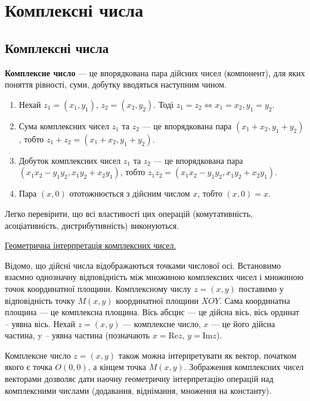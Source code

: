 \chapter{Комплексні числа}


\section{Комплексні числа}

\begin{definition}
	\textbf{Комплексне число} --- це впорядкована пара дійсних чисел
	(компонент), для яких поняття рівності, суми, добутку вводяться наступним чином.
\end{definition}

\begin{enumerate}
	\item Нехай $z_1 = (x_1,y_1)$, $z_2 = (x_2,y_2)$. Тоді $z_1 = z_2 \Leftrightarrow x_1 = x_2, y_1 = y_2$.
	
	\item Сума комплексних чисел $z_1$ та $z_2$ --- це впорядкована пара $(x_1 + x_2,y_1 + y_2)$,
	тобто $z_1 + z_2 = (x_1 + x_2,y_1 + y_2)$.

	\item Добуток комплексних чисел $z_1$ та $z_2$ --- це впорядкована пара
	$(x_1x_2 - y_1y_2,x_1y_2 + x_2y_1)$, тобто $z_1z_2 = (x_1x_2 - y_1y_2,x_1y_2 + x_2y_1)$.

	\item Пара $(x,0)$ ототожнюється з дійсним числом $x$, тобто $(x,0) = x$.
\end{enumerate}

Легко перевірити, що всі властивості цих операцій (комутативність,
асоціативність, дистрибутивність) виконуються.

\underline{Геометрична інтерпретація комплексних чисел.}

Відомо, що дійсні числа відображаються точками числової осі. Встановимо
взаємно однозначну відповідність між множиною комплексних чисел і множиною
точок координатної площини. Комплексному числу $z = (x,y)$ поставимо у
відповідність точку $M(x,y)$ координатної площини $XOY$. Сама координатна
площина --- це комплексна площина. Вісь абсцис --- це дійсна
вісь, вісь ординат -- уявна вісь. Нехай $z = (x,y)$ --- комплексне число, $x$ --- це
його дійсна частина, y – уявна частина (позначають $x = \text{Re}z$, $y = \text{Im}z$).

Комплексне число $z = (x,y)$ також можна інтерпретувати як вектор, початком
якого є точка $O(0,0)$, а кінцем точка $M(x,y)$. Зображення комплексних чисел
векторами дозволяє дати наочну геометричну інтерпретацію операцій над
комплексними числами (додавання, віднімання, множення на константу).

